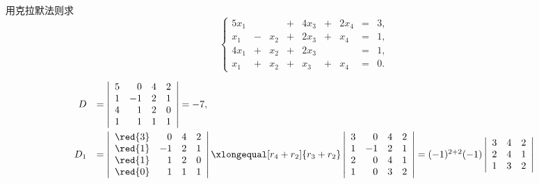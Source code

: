 \begin{frame}



\begin{testexample}
  用克拉默法则求
  $$
  \left\{
    \begin{array}{rcrcrcrcrc}
      5x_1&&&+&4x_3&+&2x_4&=&3,\\[0.1cm]
      x_1&-&x_2&+&2x_3&+& x_4&=&1,\\[0.1cm]
      4x_1&+&x_2&+&2x_3& & &=&1,\\[0.1cm]
      x_1&+&x_2&+& x_3&+&x_4&=&0.
    \end{array}
  \right.
  $$
\end{testexample}\pause

\begin{jie}
$$
\begin{array}{rl}
  D & = \left|
      \begin{array}{rrrr}
        5&0&4&2\\
        1&-1&2&1\\
        4&1&2&0\\
        1&1&1&1
      \end{array}
               \right| = -7, \\[0.3in]  
  D_1 & = \left|
        \begin{array}{rrrr}
          \red{3}&0&4&2\\
          \red{1}&-1&2&1\\
          \red{1}&1&2&0\\
          \red{0}&1&1&1
        \end{array}
                       \right| \xlongequal[r_4+r_2]{r_3+r_2} \left|
                       \begin{array}{rrrr}
                         3&0&4&2\\
                         1&-1&2&1\\
                         2&0&4&1\\
                         1&0&3&2
                       \end{array}
                                \right| =  (-1)^{2+2} (-1) \left|
                                \begin{array}{rrrr}
                                  3&4&2\\
                                  2&4&1\\
                                  1&3&2
                                \end{array}
                                       \right| \\[0.3in]

\end{array}$$
\end{jie}
\end{frame}
